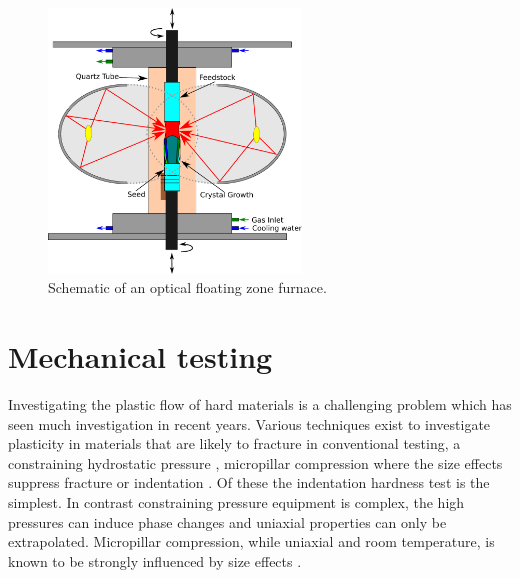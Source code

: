 \begin{figure}
\centering
\includegraphics[width=0.6\textwidth]{Image_Furnace_Schematic}
\caption{Schematic of an optical floating zone furnace.\label{fig:OFZF_schematic}}
\end{figure}














\section{Mechanical testing}
\label{sec:Ti2Ni_mechtesting}

Investigating the plastic flow of hard materials is a challenging problem which has seen much investigation in recent years. Various techniques exist to investigate plasticity in materials that are likely to fracture in conventional testing, a constraining hydrostatic pressure \cite{Griggs1936,Weinrich1975,Borvin1990}, micropillar compression where the size effects suppress fracture \cite{Uchic2004} or indentation \cite{Cripps2011,tabor2000hardness,Marsh1964,Korte2009}. Of these the indentation hardness test is the simplest. In contrast constraining pressure equipment is complex, the high pressures can induce phase changes and uniaxial properties can only be extrapolated. Micropillar compression, while uniaxial and room temperature, is known to be strongly influenced by size effects \cite{Uchic2004,Greer2005,Greer2006corrigendum}.


